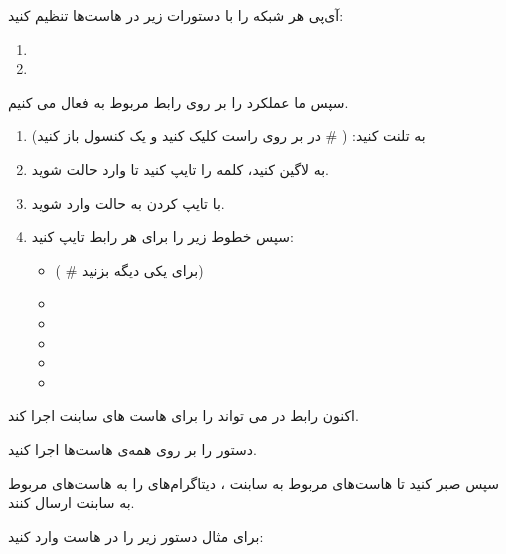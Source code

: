 \documentclass{../UTNetLabFa}
\begin{document}
	آی‌پی هر شبکه را با دستورات زیر در هاست‌ها تنظیم کنید:
	
	\begin{enumerate}
		\item {}
		\item {}
	\end{enumerate}
	
	سپس ما عملکرد  را بر روی رابط  مربوط به  فعال می کنیم.
	
	\begin{enumerate}
		\item 
			به  تلنت کنید:     ( \# در  بر روی  راست کلیک کنید و یک کنسول باز کنید)
		\item
		به  لاگین کنید، کلمه  را تایپ کنید تا وارد حالت  شوید.
		\item
		با تایپ کردن  به حالت  وارد شوید.
		\item
		سپس خطوط زیر را برای هر رابط تایپ کنید:

			\begin{itemize}
				\item {}  ( \# برای یکی دیگه  بزنید)
				\item {}
				\item {}
				\item {}
				\item {}
				\item {}
			\end{itemize}
	\end{enumerate}

	اکنون رابط  در  می تواند  را برای هاست های سابنت  اجرا کند.
	
	دستور  را بر روی همه‌ی هاست‌ها اجرا کنید.
	
	سپس صبر کنید تا هاست‌های مربوط به سابنت  ، دیتاگرام‌های  را به هاست‌های مربوط به سابنت  ارسال کنند.
	
	برای مثال دستور زیر را در هاست  وارد کنید:
	
\end{document}
